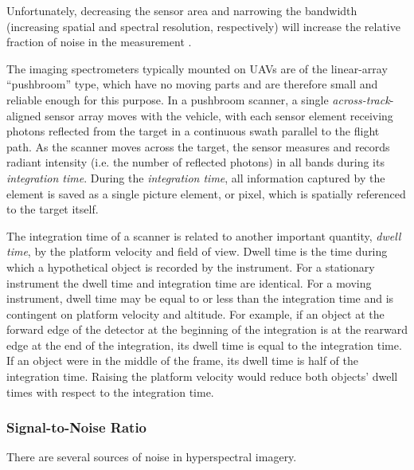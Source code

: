 Unfortunately, decreasing the sensor area and narrowing the bandwidth (increasing spatial and spectral resolution, respectively) will increase the relative fraction of noise in the measurement \cite{Moses2012, Wolfe2997}.

The imaging spectrometers typically mounted on UAVs are of the linear-array ``pushbroom'' type, which have no moving parts and are therefore small and reliable enough for this purpose. In a pushbroom scanner, a single \emph{across-track}-aligned sensor array moves with the vehicle, with each sensor element receiving photons reflected from the target in a continuous swath parallel to the flight path. As the scanner moves across the target, the sensor measures and records radiant intensity (i.e. the number of reflected photons) in all bands during its \emph{integration time}. During the \emph{integration time}, all information captured by the element is saved as a single picture element, or pixel, which is spatially referenced to the target itself. 

The integration time of a scanner is related to another important quantity, \emph{dwell time}, by the platform velocity and field of view. Dwell time is the time during which a hypothetical object is recorded by the instrument. For a stationary instrument the dwell time and integration time are identical. For a moving instrument, dwell time may be equal to or less than the integration time and is contingent on platform velocity and altitude. For example, if an object at the forward edge of the detector at the beginning of the integration is at the rearward edge at the end of the integration, its dwell time is equal to the integration time. If an object were in the middle of the frame, its dwell time is half of the integration time. Raising the platform velocity would reduce both objects' dwell times with respect to the integration time.


\subsubsection{Signal-to-Noise Ratio}

There are several sources of noise in hyperspectral imagery. 

